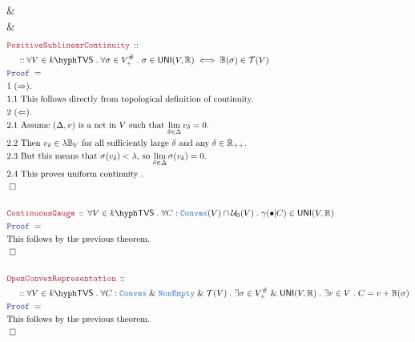 \documentclass[12pt]{scrartcl}
\newcommand{\TYPE}[1]{\textcolor{NavyBlue}{\mathtt{#1}}}
\newcommand{\LOGIC}[1]{\textcolor{Blue}{\mathtt{#1}}}
\newcommand{\THM}[1]{\textcolor{Maroon}{\mathtt{#1}}}
\renewcommand{\.}{\; . \;}
\newcommand{\Theorem}[2]{& \THM{#1} \, :: \, #2 \\ & \Proof = \\ }
\newcommand{\NewLine}{\\ & \kern 1pc}
\newcommand{\Page}[1]{ \begin{align*} #1 \end{align*}   }
\newcommand{\Explain}[1]{& \text{#1.} \\}
\renewcommand{\And}{\; \& \;}
\newcommand{\Reals}{\mathbb{R} }
\newcommand{\QED}{\; \square}
\newcommand{\EndProof}{& \QED \\}
\newcommand{\Proof}{\LOGIC{Proof} \; }
\newcommand{\T}{\mathcal{T}}
\renewcommand{\U}{\mathcal{U}}
\newcommand{\Cell}{\mathbb{B}}
\newcommand{\UNI}{\mathsf{UNI}}
\newcommand{\Convex}{\TYPE{Convex}}
\newcommand{\TVS}[1]{{#1}\hyph\mathsf{TVS}}
\begin{document}
{{	}
	\Explain{ Obvious}
	\EndProof
}\Page{
	\Theorem{PositiveSublinearContinuity}
	{
		\NewLine ::
		\forall V \in \TVS{k} \.
		\forall \sigma \in V^\#_+ \.
		\sigma \in \UNI(V,\Reals) \iff 
		\Cell(\sigma) \in \T(V)
	}
	\Explain{1 $(\Rightarrow)$}
	\Explain{1.1 This follows directly from topological definition of continuity}
	\Explain{2 $(\Leftarrow)$}
	\Explain{2.1 Assume $(\Delta,v)$ is a net in $V$ such that $\lim_{\delta \in \Delta} v_\delta = 0$}
	\Explain{2.2 Then $v_\delta \in  \lambda \Cell_V$ for all sufficiently large $\delta$ 
		and any $\delta \in \Reals_{++}$}
	\Explain{2.3 But this means that $\sigma(v_\delta) < \lambda$, so  
		$\lim_{\delta \in \Delta} \sigma(v_\delta) = 0$}
	\Explain{2.4 This proves uniform continuity }
	\EndProof
	\\
	\Theorem{ContinuousGauge}{
		\forall V \in \TVS{k} \.
		\forall C : \Convex(V) \cap \U_0(V) \.
		\gamma(\bullet|C) \in \UNI(V,\Reals) 
	}
	\Explain{This follows by the previous theorem}
	\EndProof
	\\
	\Theorem{OpenConvexRepresentation}
	{
		\NewLine ::		
		\forall V \in \TVS{k} \.
		\forall C : \Convex \And \TYPE{NonEmpty} \And \T(V) \.
		\exists \sigma \in V^\#_+ \And \UNI(V,\Reals) \.
		\exists v \in V \.
		C = v + \Cell(\sigma)
	}
	\Explain{This follows by the previous theorem}
	\EndProof
}
\newpage
\end{document}
